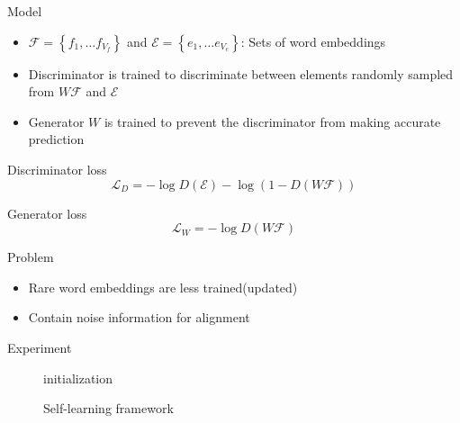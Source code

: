 \documentclass[11pt, a4paper, landscape]{article}
\begin{document}
	
	\NewPage
	\vfill
	Model
	\begin{itemize}
		\item  ${\mathcal{F} = \left\{ f_1, \ldots f_{V_f} \right\} }$ and  ${\mathcal{E} = \left\{ e_1, \ldots e_{V_e} \right\} }$: Sets of word embeddings
		\item Discriminator is trained to discriminate between elements randomly sampled from ${W \mathcal{F}}$ and ${\mathcal{E}}$ 
		\item Generator ${W}$ is trained to prevent the discriminator from making accurate prediction
		
	\end{itemize}
	
	
	
	Discriminator loss
	\[ \mathcal{L}_D = -\log D(\mathcal{E}) - \log (1-D(W\mathcal{F}))\]
	
	
	Generator  loss 
	\[ \mathcal{L}_W = -\log D(W\mathcal{F})\]
	\vfill
	
	\NewPage
	\vfill
	Problem
	\begin{itemize}
		\item Rare word embeddings are less trained(updated)
		\item Contain noise information for alignment
	\end{itemize}
	Experiment
	\vfill
	\NewPage
	\begin{figure}[ht]
		\centering
		\begin{minipage}{.7\linewidth}
			\begin{algorithm}[H]
				\SetAlgoLined
				initialization\;
			
			\caption{Self-learning framework}
			\end{algorithm}
		\end{minipage}
	\end{figure}


	\NewPage
\end{document}
